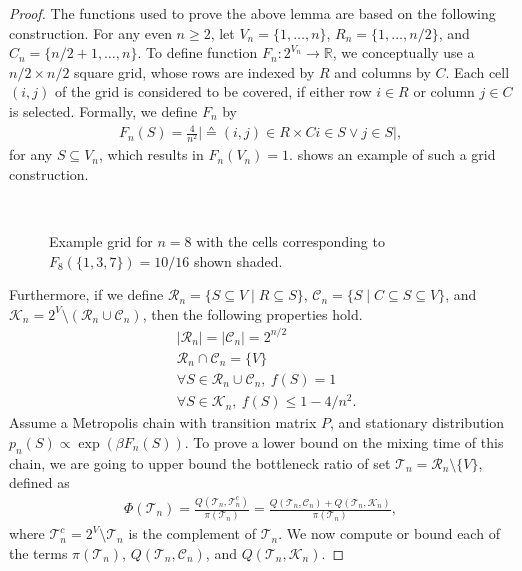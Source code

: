 \begin{proof}
The functions used to prove the above lemma are based on the following construction.
For any even $n \geq 2$, let $V_n = \{1,\ldots,n\}$, $R_n = \{1,\ldots,n/2\}$, and $C_n = \{n/2+1,\ldots,n\}$.
To define function $F_n : 2^{V_n} \to \mathbb{R}$, we conceptually use a $n/2 \times n/2$ square grid, whose rows are indexed by $R$ and columns by $C$.
Each cell $(i, j)$ of the grid is considered to be covered, if either row $i \in R$ or column $j \in C$ is selected.
Formally, we define $F_n$ by
\begin{align*}
  F_n(S) = \frac{4}{n^2}\big\vert \sdef{(i, j) \in R \times C}{i \in S \lor j \in S}\big\vert,
\end{align*}
for any $S \subseteq V_n$, which results in $F_n(V_n) = 1$.
 shows an example of such a grid construction.

\begin{figure}[htb]
  \centering
  \\[1em]
  \caption{Example grid for $n = 8$ with the cells corresponding to $F_8(\{1,3,7\}) = 10/16$ shown shaded.}
  \label{fig:submod_grid}
\end{figure}

\newcommand{\hrn}{\mathcal{R}_n}
\newcommand{\hcn}{\mathcal{C}_n}
\newcommand{\hkn}{\mathcal{K}_n}
\newcommand{\htn}{\mathcal{T}_n}

Furthermore, if we define $\hrn = \{S \subseteq V \mid R \subseteq S\}$, $\hcn = \{S \mid C \subseteq S \subseteq V\}$, and $\hkn = 2^V \setminus (\hrn \cup \hcn)$, then the following properties hold.
\begin{align}
  &|\hrn| = |\hcn| = 2^{n/2} \label{eq:prop1} \\
  &\hrn \cap \hcn = \{V\} \label{eq:prop2} \\
  &\forall S \in \hrn\cup\hcn,\ f(S) = 1 \label{eq:prop3} \\
  &\forall S \in \hkn,\ f(S) \leq 1 - 4/n^2 \label{eq:prop4}.
\end{align}
Assume a Metropolis chain with transition matrix $P$, and stationary distribution $p_n(S) \propto \exp(\beta F_n(S))$.
To prove a lower bound on the mixing time of this chain, we are going to upper bound the bottleneck ratio \citep[Ch. 7]{levin08} of set $\htn = \hrn \setminus \{V\}$, defined as
\begin{align*}
  \Phi(\htn) = \frac{Q(\htn, \htn^c)}{\pi(\htn)} = \frac{Q(\htn, \hcn) + Q(\htn, \hkn)}{\pi(\htn)},
\end{align*}
where $\htn^c = 2^V \setminus \htn$ is the complement of $\htn$. We now compute or bound each of the terms $\pi(\htn)$, $Q(\htn, \hcn)$, and $Q(\htn, \hkn)$.


\end{proof}
